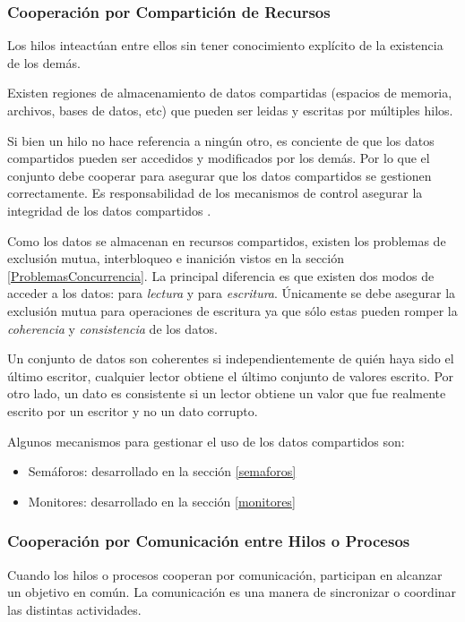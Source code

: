 \subsubsection{Cooperación por Compartición de Recursos}

Los hilos inteactúan entre ellos sin tener conocimiento explícito de la
existencia de los demás.

Existen regiones de almacenamiento de datos compartidas (espacios de memoria,
archivos, bases de datos, etc) que pueden ser leidas y escritas por múltiples
hilos.

Si bien un hilo no hace referencia a ningún otro, es conciente de que los
datos compartidos pueden ser accedidos y modificados por los demás. Por lo que
el conjunto debe cooperar para asegurar que los datos compartidos se gestionen
correctamente. Es responsabilidad de los mecanismos de control asegurar la
integridad de los datos compartidos \cite{SistOpStallings}.

Como los datos se almacenan en recursos compartidos, existen los problemas de
exclusión mutua, interbloqueo e inanición vistos en la sección
\ref{ProblemasConcurrencia}. La principal diferencia es que existen dos modos de
acceder a los datos: para \textit{lectura} y para \textit{escritura}. Únicamente
se debe asegurar la exclusión mutua para operaciones de escritura ya que sólo
estas pueden romper la \textit{coherencia} y \textit{consistencia} de los datos.

Un conjunto de datos son coherentes si independientemente de quién haya sido el
último escritor, cualquier lector obtiene el último conjunto de valores escrito.
Por otro lado, un dato es consistente si un lector obtiene un valor que fue
realmente escrito por un escritor y no un dato corrupto.

Algunos mecanismos para gestionar el uso de los datos compartidos son:
\begin{itemize}
    \item Semáforos: desarrollado en la sección \ref{semaforos}
    \item Monitores: desarrollado en la sección \ref{monitores}
\end{itemize}

\subsubsection{Cooperación por Comunicación entre Hilos o Procesos}

Cuando los hilos o procesos cooperan por comunicación, participan en alcanzar un
objetivo en común. La comunicación es una manera de sincronizar o coordinar las
distintas actividades.

